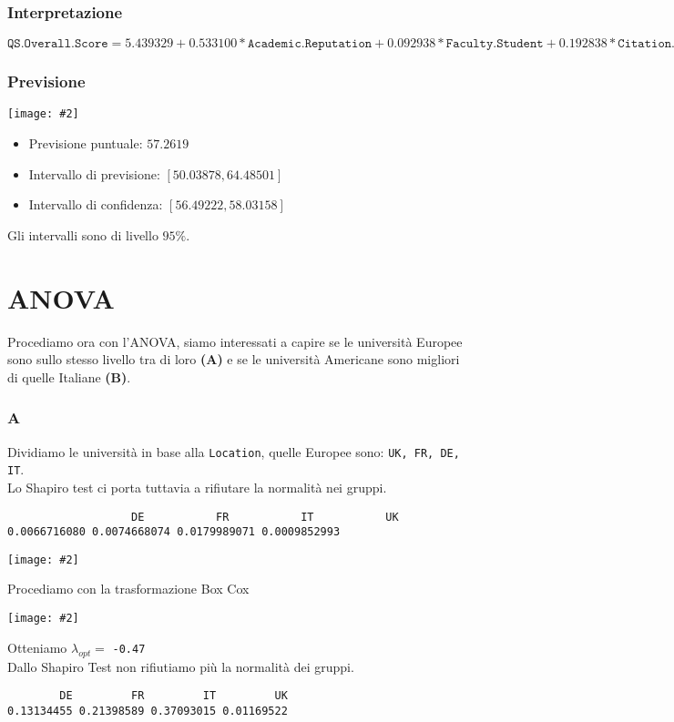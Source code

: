 \documentclass{beamer}
\newcommand{\fg}[2]{%
  \begin{center}
      \texttt{[image: \#2]}%
  \end{center}
}
\begin{document}
\begin{frame}[fragile]
\frametitle{Interpretazione}
    $\texttt{QS.Overall.Score} = 5.439329 + 0.533100*\texttt{Academic.Reputation} + 0.092938*\texttt{Faculty.Student} + 0.192838*\texttt{Citation.Per.Faculty} + 0.101901*\texttt{International.Student}$

\end{frame}

\begin{frame}
\frametitle{Previsione}
    \fg{1}{datasetpoli.jpg}
    \begin{itemize}
        \item Previsione puntuale: $57.2619$
        \item Intervallo di previsione: $[50.03878,64.48501]$ 
        \item Intervallo di confidenza: $[56.49222,58.03158]$
    \end{itemize}
    Gli intervalli sono di livello $95\%$.
\end{frame}

\section{ANOVA}

\begin{frame}
	Procediamo ora con l'ANOVA, siamo interessati a capire se le università Europee sono sullo stesso livello tra di loro \textbf{(A)} e se le università Americane sono migliori di quelle Italiane \textbf{(B)}.

\end{frame}

\begin{frame}[fragile]
\frametitle{A}
    Dividiamo le università in base alla \texttt{Location}, quelle Europee sono: \texttt{UK, FR, DE, IT}.\\
	Lo Shapiro test ci porta tuttavia a rifiutare la normalità nei gruppi.
	{\SMALL
 \begin{verbatim}
		           DE           FR           IT           UK 
0.0066716080 0.0074668074 0.0179989071 0.0009852993
	\end{verbatim}
 }
    \fg{0.4}{boxplot1}
\end{frame}

\begin{frame}[fragile]
    Procediamo con la trasformazione Box Cox
    \fg{0.4}{boxcoxgiusto.jpg}
    Otteniamo $\lambda_{opt} =$ \texttt{-0.47}\\
    Dallo Shapiro Test non rifiutiamo più la normalità dei gruppi.
    \begin{verbatim}
        DE         FR         IT         UK 
0.13134455 0.21398589 0.37093015 0.01169522
    \end{verbatim}	
\end{frame}
\end{document}
